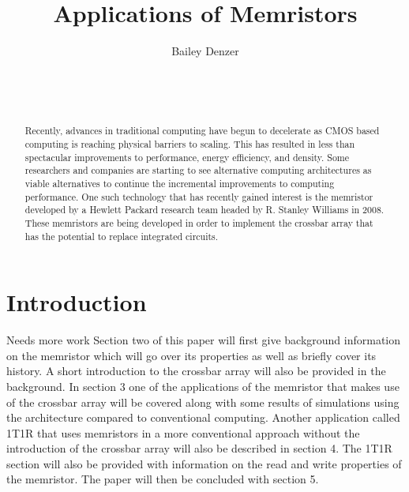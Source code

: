 \documentclass{sig-alternate}
\begin{document}

\title{Applications of Memristors}


\author{
\alignauthor
Bailey Denzer\\
	\\
	\\
	\\
}

\maketitle
\begin{abstract}

Recently, advances in traditional computing have begun to decelerate as CMOS based computing is reaching physical barriers to scaling.  This has resulted in less than spectacular improvements to performance, energy efficiency, and density.  Some researchers and companies are starting to see alternative computing architectures as viable alternatives to continue the incremental improvements to computing performance.  One such technology that has recently gained interest is the memristor developed by a Hewlett Packard research team headed by R. Stanley Williams in 2008.  These memristors are being developed in order to implement the crossbar array that has the potential to replace integrated circuits.  

\end{abstract}


\section{Introduction}
\label{sec:introduction}


{Needs more work}
Section two of this paper will first give background information on the memristor which will go over its properties as well as briefly cover its history.  A short introduction to the crossbar array will also be provided in the background.  In section 3 one of the applications of the memristor that makes use of the crossbar array will be covered along with some results of simulations using the architecture compared to conventional computing.  Another application called 1T1R that uses memristors in a more conventional approach without the introduction of the crossbar array will also be described in section 4.  The 1T1R section will also be provided with information on the read and write properties of the memristor.  The paper will then be concluded with section 5.
\end{document}
